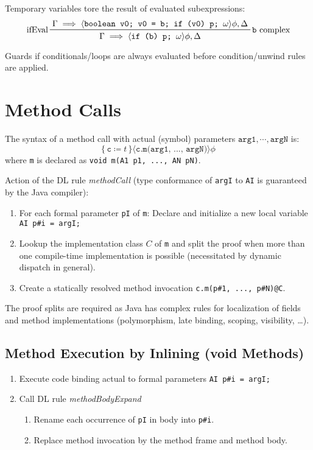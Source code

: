 \documentclass[a4paper, 11pt, accentcolor = tud3b]{tudreport}
\begin{document}
			Temporary variables tore the result of evaluated subexpressions:
			\begin{equation*}
				\prftree[l, r]
					{\texttt{b} complex}
					{ifEval}
					{\Gamma \implies \langle \texttt{boolean v0; v0 = b; if (v0) p; } \omega \rangle \phi, \Delta}
					{\Gamma \implies \langle \texttt{if (b) p; } \omega \rangle \phi, \Delta}
			\end{equation*}
			
			Guards if conditionals/loops are always evaluated before condition/unwind rules are applied.

		\section{Method Calls}
			The syntax of a method call with actual (symbol) parameters \( \texttt{arg1}, \cdots, \texttt{argN} \) is:
			\begin{equation*}
				\{\, \texttt{c} \coloneqq t \,\} \langle \texttt{c.m(arg1, ..., argN)} \rangle \phi
			\end{equation*}
			where \texttt{m} is declared as \texttt{void m(A1 p1, ..., AN pN)}.
			
			Action of the DL rule \textit{methodCall} (type conformance of \texttt{argI} to \texttt{AI} is guaranteed by the Java compiler):
			\begin{enumerate}
				\item For each formal parameter \texttt{pI} of \texttt{m}: Declare and initialize a new local variable \texttt{AI p\#i = argI;}
				\item Lookup the implementation class \(C\) of \texttt{m} and split the proof when more than one compile-time implementation is possible (necessitated by dynamic dispatch in general).
				\item Create a statically resolved method invocation \texttt{c.m(p\#1, ..., p\#N)@C}.
			\end{enumerate}
			The proof splits are required as Java has complex rules for localization of fields and method implementations (polymorphism, late binding, scoping, visibility, \dots).
		
			\subsection{Method Execution by Inlining (void Methods)}
				\begin{enumerate}
					\item Execute code binding actual to formal parameters \texttt{AI p\#i = argI;}
					\item Call DL rule \textit{methodBodyExpand}
						\begin{enumerate}
							\item Rename each occurrence of \texttt{pI} in body into \texttt{p\#i}.
							\item Replace method invocation by the method frame and method body.
						\end{enumerate}
				\end{enumerate}
			
\end{document}
